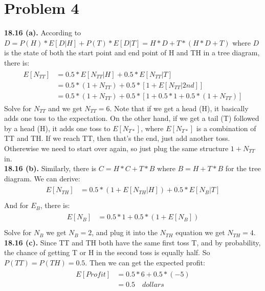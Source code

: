 \documentclass[titlepage, paper=a4, fontsize=11pt]{scrartcl} %
\numberwithin{equation}{section} %
\numberwithin{figure}{section} %
\numberwithin{table}{section} %
\begin{document}

\section*{Problem 4}
\textbf{18.16 (a).}
According to $D = P(H) * E[D | H] + P(T) * E[D | T] = H * D + T * (H * D + T)$ where $D$ is the state of both the start point and end point of H and TH in a tree diagram, there is:
\begin{align*} 
\begin{split}
E[N_{TT}] &= 0.5 * E[N_{TT} | H] + 0.5 * E[N_{TT} | T] \\
&= 0.5 * (1 + N_{TT}) + 0.5 * [1 + E[N_{TT} | 2nd]] \\
&= 0.5 * (1 + N_{TT}) + 0.5 * [1 + 0.5 * 1 + 0.5 * (1 + N_{TT})]
\end{split}					
\end{align*}
Solve for $N_{TT}$ and we get $N_{TT} = 6$.
Note that if we get a head (H), it basically adds one toss to the expectation. On the other hand, if we get a tail (T) followed by a head (H), it adds one toss to $E[N_{T*}]$, where $E[N_{T*}]$ is a combination of TT and TH. If we reach TT, then that's the end, just add another toss. Otherewise we need to start over again, so just plug the same structure $1 + N_{TT}$ in.
\\
\textbf{18.16 (b).}
Similarly, there is $C = H * C + T * B$ where $B = H + T * B$ for the tree diagram. We can derive:
\begin{align*} 
\begin{split}
E[N_{TH}] &= 0.5 * ( 1 + E[N_{TH} | H] ) + 0.5 * E[N_{B} | T] \\
\end{split}					
\end{align*}
And for $E_{B}$, there is:
\begin{align*} 
\begin{split}
E[N_{B}] &= 0.5 * 1 + 0.5 * ( 1 + E[N_{B}] ) \\
\end{split}					
\end{align*}
Solve for $N_{B}$ we get $N_{B} = 2$, and plug it into the $N_{TH}$ equation we get $N_{TH} = 4$.
\\
\textbf{18.16 (c).}
Since TT and TH both have the same first toss T, and by probability, the chance of getting T or H in the second toss is equally half. So $P(TT) = P(TH) = 0.5$. Then we can get the expected profit:
\begin{align*} 
\begin{split}
E[Profit] &= 0.5 * 6 + 0.5 * (-5) \\
&= 0.5 \quad dollars
\end{split}					
\end{align*}
\\
\end{document}
